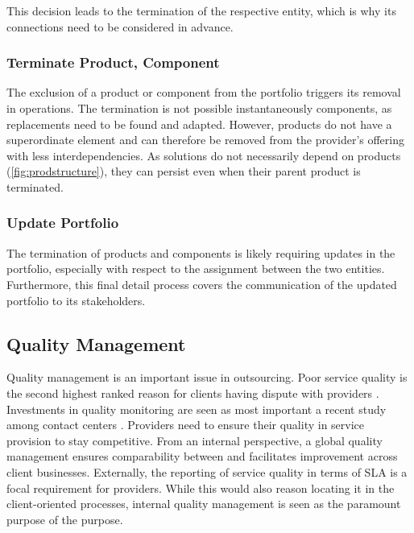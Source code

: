 	This decision leads to the termination of the respective entity, which is why its connections need to be considered in advance. 
	
	\subsubsection{Terminate Product, Component}
	The exclusion of a product or component from the portfolio triggers its removal in operations. The termination is not  possible instantaneously \wrt components, as replacements need to be found and adapted. However, products do not have a superordinate element and can therefore be removed from the provider's offering with less interdependencies. As solutions do not necessarily depend on products (\cf \Fig \ref{fig:prodstructure}), they can persist even when their parent product is terminated. 
	
	
	\subsubsection{Update Portfolio}
	The termination of products and components is likely requiring updates in the portfolio, especially with respect to the assignment between the two entities. Furthermore, this final detail process covers the communication of the updated portfolio to its stakeholders. 
	
	\subsection{Quality Management}
	\label{sec:qualmang}
	
	Quality management is an important issue in outsourcing. Poor service quality is the second highest ranked reason for clients having dispute with providers \citep{deloitte2014outsourcing}. Investments in quality monitoring are seen as most important a recent study among contact centers \citep{ccnet2016}. Providers need to ensure their quality in service provision to stay competitive. From an internal perspective, a global quality management ensures comparability between and facilitates improvement across client businesses. Externally, the reporting of service quality in terms of \acrshort{SLA} is a focal requirement for providers. While this would also reason locating it in the client-oriented processes, internal quality management is seen as the paramount purpose of the purpose. 
	
